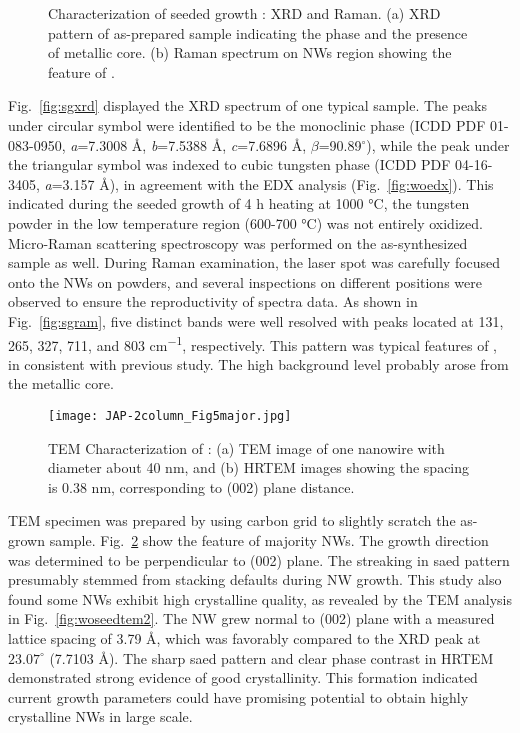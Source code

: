 \begin{figure}[htb]
\centering
{}\hspace{0.04\textwidth}
\caption[Characterization of seeded growth : XRD and Raman]{Characterization of seeded growth : XRD and Raman. (a) XRD pattern of as-prepared sample indicating the  phase and the presence of metallic core. (b) Raman spectrum on NWs region showing the feature of .}
\label{fig:woseedxrd}
\end{figure}

Fig.~\ref{fig:sgxrd} displayed the XRD spectrum of one typical sample. The peaks under circular symbol were identified to be the monoclinic  phase (ICDD PDF 01-083-0950, \emph{a}=7.3008 \AA, \emph{b}=7.5388 \AA, \emph{c}=7.6896 \AA, $\beta$=90.89$^\circ$), while the peak under the triangular symbol was indexed to cubic tungsten phase (ICDD PDF 04-16-3405, \emph{a}=3.157 \AA), in agreement with the EDX analysis (Fig.~\ref{fig:woedx}). This indicated during the  seeded growth of 4 h heating at 1000 \si{\degreeCelsius}, the tungsten powder in the low temperature region (600-700 \si{\degreeCelsius}) was not entirely oxidized. Micro-Raman scattering spectroscopy was performed on the as-synthesized sample as well. During Raman examination, the laser spot was carefully focused onto the NWs on powders, and several inspections on different positions were observed to ensure the reproductivity of spectra data. As shown in Fig.~\ref{fig:sgram}, five distinct bands were well resolved with peaks located at 131, 265, 327, 711, and 803 \si{cm^{-1}}, respectively. This pattern was typical features of , in consistent with previous study.\cite{Salje1975a,Dixit1986} The high background level probably arose from the metallic core.
\begin{figure}[htb]
\centering
\texttt{[image: JAP-2column\_Fig5major.jpg]}
\caption[Characterization of : TEM]{TEM Characterization of : (a) TEM image of one nanowire with diameter about 40 nm, and (b) HRTEM images showing the spacing is 0.38 nm, corresponding to (002) plane distance.}
\label{fig:woseedtem1}
\end{figure}

TEM specimen was prepared by using carbon grid to slightly scratch the as-grown sample. Fig.~\ref{fig:woseedtem1} show the feature of majority NWs. The growth direction was determined to be perpendicular to (002) plane. The streaking in \gls{saed} pattern presumably stemmed from stacking defaults during  NW growth. This study also found some NWs exhibit high crystalline quality, as revealed by the TEM analysis in Fig.~\ref{fig:woseedtem2}. The NW grew normal to (002) plane with a measured lattice spacing of 3.79 \si{\angstrom}, which was favorably compared to the XRD peak at $23.07^\circ$ (7.7103 \si{\angstrom}). The sharp \gls{saed} pattern and clear phase contrast in HRTEM demonstrated strong evidence of good crystallinity. This formation indicated current growth parameters could have promising potential to obtain highly crystalline  NWs in large scale. 

